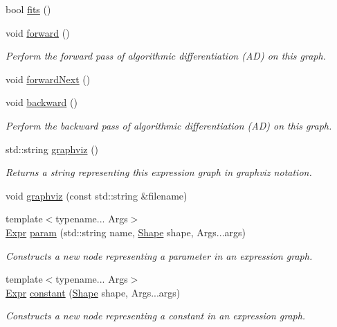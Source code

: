\begin{DoxyCompactItemize}
bool \hyperlink{classmarian_1_1ExpressionGraph_a1ce5fad852cb6d30cfd0a2d729bb44c3}{fits} ()
\item 
void \hyperlink{classmarian_1_1ExpressionGraph_aa7596e34cc2895cf374ce06d9d5ee370}{forward} ()
\begin{DoxyCompactList}\small\item\em Perform the forward pass of algorithmic differentiation (AD) on this graph. \end{DoxyCompactList}\item 
void \hyperlink{classmarian_1_1ExpressionGraph_a41337743d6e030cf6b8e2b2e4d39a908}{forward\+Next} ()
\item 
void \hyperlink{classmarian_1_1ExpressionGraph_ae4be44e38a47b0964a24880078eb16c3}{backward} ()
\begin{DoxyCompactList}\small\item\em Perform the backward pass of algorithmic differentiation (AD) on this graph. \end{DoxyCompactList}\item 
std\+::string \hyperlink{classmarian_1_1ExpressionGraph_a3bbdbd8964031c78c7825958d1e9c9fe}{graphviz} ()
\begin{DoxyCompactList}\small\item\em Returns a string representing this expression graph in {\ttfamily graphviz} notation. \end{DoxyCompactList}\item 
void \hyperlink{classmarian_1_1ExpressionGraph_a88799e5f11eafccfcd165c4ecee9d04f}{graphviz} (const std\+::string \&filename)
\item 
{\footnotesize template$<$typename... Args$>$ }\\\hyperlink{namespacemarian_a498d8baf75b754011078b890b39c8e12}{Expr} \hyperlink{classmarian_1_1ExpressionGraph_afbda84b9c30ce21ba27f2283b6e9db2d}{param} (std\+::string name, \hyperlink{structmarian_1_1Shape}{Shape} shape, Args...\+args)
\begin{DoxyCompactList}\small\item\em Constructs a new node representing a parameter in an expression graph. \end{DoxyCompactList}\item 
{\footnotesize template$<$typename... Args$>$ }\\\hyperlink{namespacemarian_a498d8baf75b754011078b890b39c8e12}{Expr} \hyperlink{classmarian_1_1ExpressionGraph_a98fec0be161df64c066f9d871aba4274}{constant} (\hyperlink{structmarian_1_1Shape}{Shape} shape, Args...\+args)
\begin{DoxyCompactList}\small\item\em Constructs a new node representing a constant in an expression graph. \end{DoxyCompactList}\item 

\end{DoxyCompactItemize}
